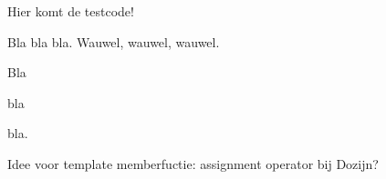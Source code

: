 \newcommand{\sectionCode}[1]{%
	\section[\texttt{#1}]{\texorpdfstring{\cppcode{#1}}{#1}}%
}
\newcommand{\sectionTextCode}[2]{%
	\section[#1 \texttt{#2}]{#1 \texorpdfstring{\cppcode{#2}}{#2}}%
}
\newcommand{\sectionCodeText}[2]{%
	\section[\texttt{#1} #2]{\texorpdfstring{\cppcode{#1}}{#1} #2}%
}
\newcommand{\sectionTextCodeText}[3]{%
	\section[#1 \texttt{#2} #3]{#1 \texorpdfstring{\cppcode{#2}}{#2} #3}%
}
\newcommand{\sectionTextCodeTextNoSpaces}[3]{%
	\section[#1\texttt{#2}#3]{#1\texorpdfstring{\cppcode{#2}}{#2}#3}%
}
\newcommand{\subsectionCode}[1]{%
	\subsection[\texttt{#1}]{\texorpdfstring{\cppcode{#1}}{#1}}%
}
\newcommand{\subsectionTextCode}[2]{%
	\subsection[#1 \texttt{#2}]{#1 \texorpdfstring{\cppcode{#2}}{#2}}%
}
\newcommand{\subsectionTextCodeText}[3]{%
	\subsection[#1 \texttt{#2} #3]{#1 \texorpdfstring{\cppcode{#2}}{#2} #3}%
}


\begin{cpplstShortInline}

Hier komt de testcode!

Bla bla bla.%
Wauwel, wauwel, wauwel.

Bla
\begin{samepage}%
bla
\end{samepage}%
bla.

Idee voor template memberfuctie:
assignment operator bij Dozijn?

\end{cpplstShortInline}
